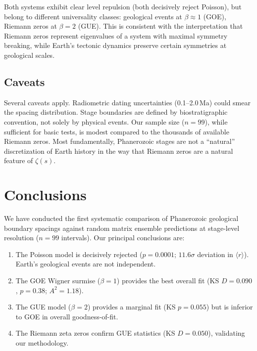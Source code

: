 \documentclass[12pt,a4paper]{article}
\begin{document}
Both systems exhibit clear level repulsion (both decisively reject Poisson), but belong to different universality classes: geological events at $\beta \approx 1$ (GOE), Riemann zeros at $\beta = 2$ (GUE). This is consistent with the interpretation that Riemann zeros represent eigenvalues of a system with maximal symmetry breaking, while Earth's tectonic dynamics preserve certain symmetries at geological scales.

\subsection{Caveats}

Several caveats apply. Radiometric dating uncertainties (0.1--2.0\,Ma) could smear the spacing distribution. Stage boundaries are defined by biostratigraphic convention, not solely by physical events. Our sample size ($n = 99$), while sufficient for basic tests, is modest compared to the thousands of available Riemann zeros. Most fundamentally, Phanerozoic stages are not a ``natural'' discretization of Earth history in the way that Riemann zeros are a natural feature of $\zeta(s)$.


\section{Conclusions}

We have conducted the first systematic comparison of Phanerozoic geological boundary spacings against random matrix ensemble predictions at stage-level resolution ($n = 99$ intervals). Our principal conclusions are:

\begin{enumerate}
    \item The Poisson model is decisively rejected ($p = 0.0001$; $11.6\sigma$ deviation in $\langle r \rangle$). Earth's geological events are not independent.
    \item The GOE Wigner surmise ($\beta = 1$) provides the best overall fit (KS $D = 0.090$, $p = 0.38$; $A^2 = 1.18$).
    \item The GUE model ($\beta = 2$) provides a marginal fit (KS $p = 0.055$) but is inferior to GOE in overall goodness-of-fit.
    \item The Riemann zeta zeros confirm GUE statistics (KS $D = 0.050$), validating our methodology.
\end{enumerate}
\end{document}
